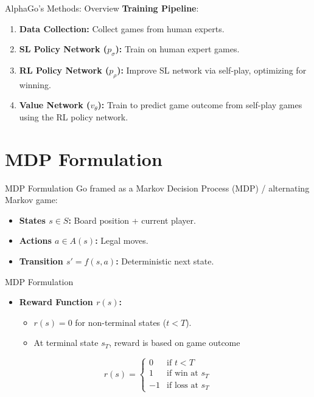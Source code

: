 \documentclass{beamer}
\begin{document}
\begin{frame}{AlphaGo's Methods: Overview}
    \textbf{Training Pipeline}:
    \vspace{2ex}
    \begin{enumerate}
        \setlength{\itemsep}{2ex}
        \item \textbf{Data Collection:} Collect games from human experts.
        \item \textbf{SL Policy Network ($p_{\sigma}$):} Train on human expert games.
        \item \textbf{RL Policy Network ($p_{\rho}$):} Improve SL network via self-play, optimizing for winning.
        \item \textbf{Value Network ($v_{\theta}$):} Train to predict game outcome from self-play games using the RL policy network.
    \end{enumerate}
\end{frame}


\section{MDP Formulation}
\begin{frame}{MDP Formulation}
    Go framed as a Markov Decision Process (MDP) / alternating Markov game:
    \vspace{2ex}
    \begin{itemize}
        \item \textbf{States $s \in S$:} Board position + current player.
        \item \textbf{Actions $a \in A(s)$:} Legal moves.
        \item \textbf{Transition $s' = f(s, a)$:} Deterministic next state.
    \end{itemize}
\end{frame}

\begin{frame}{MDP Formulation}
    \begin{itemize}
        \item \textbf{Reward Function $r(s)$:}
        \vspace{2ex}
        \begin{itemize}
            \item $r(s) = 0$ for non-terminal states ($t < T$).
            \item At terminal state $s_T$, reward is based on game outcome
        \end{itemize}
    \end{itemize}
    \vspace{3ex}
    \[
        r(s) =
        \begin{cases}
            0 & \text{if } t < T \\
            1 & \text{if win at } s_T \\
            -1 & \text{if loss at } s_T
        \end{cases}
    \]
\end{frame}
\end{document}
